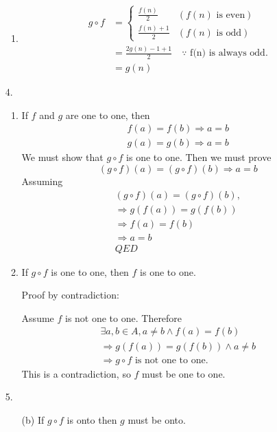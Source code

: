 \documentclass[fleqn]{article}
\begin{document}
\begin{enumerate}
\begin{enumerate}
		\item %
		\begin{align*}
			g \circ f &=
			\begin{cases}
				\frac{f(n)}{2} & (f(n) \text{ is even}) \\
				\frac{f(n) + 1}{2} & (f(n) \text{ is odd})
			\end{cases} \\
			&= \frac{2g(n) - 1 + 1}{2} \quad \because \text{ f(n) is always odd.} \\
			&= g(n)
		\end{align*}
	\end{enumerate}

    \item[4.]
    \begin{enumerate}
		\item %
		If \(f\) and \(g\) are one to one, then
		\begin{gather*}
			f(a) = f(b) \Rightarrow a = b \\
			g(a) = g(b) \Rightarrow a = b
		\end{gather*}
		We must show that \(g \circ f\) is one to one. Then we must prove
		\[(g \circ f)(a) = (g \circ f)(b) \Rightarrow a = b\]
		Assuming
		\begin{gather*}
			(g \circ f)(a) = (g \circ f)(b), \\
			\Rightarrow g(f(a)) = g(f(b)) \\
			\Rightarrow f(a) = f(b) \\
			\Rightarrow a = b \\
			QED
		\end{gather*}

		\item %
		If \(g \circ f\) is one to one, then \(f\) is one to one.
	
		Proof by contradiction:

		Assume \(f\) is not one to one. Therefore 
		\begin{gather*}
			\exists a, b \in A, a \neq b \land f(a) = f(b) \\
			\Rightarrow g(f(a)) = g(f(b)) \land a \neq b \\
			\Rightarrow g \circ f \text{ is not one to one.}
		\end{gather*}
		This is a contradiction, so \(f\) must be one to one.
	\end{enumerate}

	\item[5.]
	\begin{enumerate}
		\item[(b)]
		If \(g \circ f\) is onto then \(g\) must be onto.


\end{enumerate}
\end{enumerate}
\end{document}
